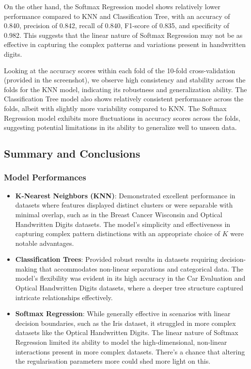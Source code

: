 \documentclass[letterpaper,10pt]{article}
\begin{document}
On the other hand, the Softmax Regression model shows relatively lower performance compared to KNN and Classification Tree, with an accuracy of 0.840, precision of 0.842, recall of 0.840, F1-score of 0.835, and specificity of 0.982. This suggests that the linear nature of Softmax Regression may not be as effective in capturing the complex patterns and variations present in handwritten digits.

Looking at the accuracy scores within each fold of the 10-fold cross-validation (provided in the screenshot), we observe high consistency and stability across the folds for the KNN model, indicating its robustness and generalization ability. The Classification Tree model also shows relatively consistent performance across the folds, albeit with slightly more variability compared to KNN. The Softmax Regression model exhibits more fluctuations in accuracy scores across the folds, suggesting potential limitations in its ability to generalize well to unseen data.

\subsection{Summary and Conclusions}
\subsubsection{Model Performances}

\begin{itemize}
    \item \textbf{K-Nearest Neighbors (KNN)}: Demonstrated excellent performance in datasets where features displayed distinct clusters or were separable with minimal overlap, such as in the Breast Cancer Wisconsin and Optical Handwritten Digits datasets. The model's simplicity and effectiveness in capturing complex pattern distinctions with an appropriate choice of $K$ were notable advantages.
    
    \item \textbf{Classification Trees}: Provided robust results in datasets requiring decision-making that accommodates non-linear separations and categorical data. The model's flexibility was evident in its high accuracy in the Car Evaluation and Optical Handwritten Digits datasets, where a deeper tree structure captured intricate relationships effectively.
    
    \item \textbf{Softmax Regression}: While generally effective in scenarios with linear decision boundaries, such as the Iris dataset, it struggled in more complex datasets like the Optical Handwritten Digits. The linear nature of Softmax Regression limited its ability to model the high-dimensional, non-linear interactions present in more complex datasets. There's a chance that altering the regularisation parameters more could shed more light on this.
\end{itemize}
\end{document}
